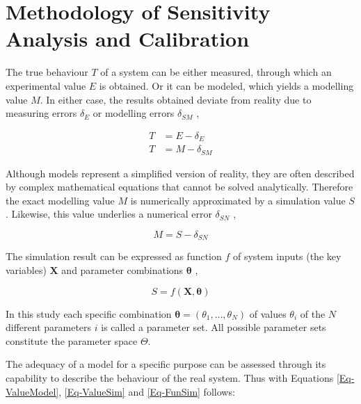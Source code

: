 

\section{Methodology of Sensitivity Analysis and Calibration}
\label{Sec-SAnaCal}

The true behaviour $T$ of a system can be either measured, through which an experimental value $E$ is obtained. 
Or it can be modeled, which yields a modelling value $M$. 
In either case, the results obtained deviate from reality due to measuring errors $\delta_E$ or modelling errors $\delta_{SM}$ \parencite{Stern.2001},

\begin{align}
    T & =  E - \delta_E \label{Eq-ValueEx} \\
    T & =  M - \delta_{SM} \label{Eq-ValueModel}
\end{align}

Although models represent a simplified version of reality, they are often described by complex mathematical equations that cannot be solved analytically. 
Therefore the exact modelling value $M$ is numerically approximated by a simulation value $S$. 
Likewise, this value underlies a numerical error $\delta_{SN}$ \parencite{Stern.2001},

\begin{equation}
    \label{Eq-ValueSim}
    M = S - \delta_{SN}
\end{equation}

The simulation result can be expressed as function $f$ of system inputs (the key variables) $\bm{X}$ and parameter combinations $\bm{\theta}$ \parencite{Naeini.2019},

\begin{equation}
    \label{Eq-FunSim}
    S = f(\bm{X},\bm{\theta})
\end{equation}

In this study each specific combination $\bm{\theta} = ( \theta_1,\dots,\theta_N)$ of values $\theta_i$ of the $N$ different parameters $i$ is called a parameter set. 
All possible parameter sets constitute the parameter space $\Theta$.

The adequacy of a model for a specific purpose can be assessed through its capability to describe the behaviour of the real system. 
Thus with Equations \eqref{Eq-ValueModel}, \eqref{Eq-ValueSim} and \eqref{Eq-FunSim} follows:


